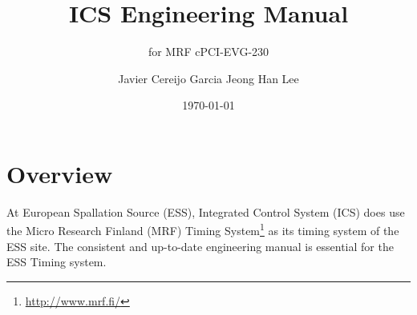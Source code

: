 \documentclass[11pt
  , a4paper
  , article
  , oneside
  , showtrims
]{memoir}
\begin{document}


\date{\today}




\title{ICS Engineering Manual}
\subtitle{for MRF cPCI-EVG-230}
\author{Javier Cereijo Garcia \newline Jeong Han Lee }



\showtrimson

\esstitle
\newpage
\tableofcontents
\newpage



\chapter{Overview}
At European Spallation Source (ESS), Integrated Control System (ICS) does use the Micro Research Finland (MRF) Timing System{\footnote{\url{http://www.mrf.fi/}}} as its timing system of the ESS site. The consistent and up-to-date engineering manual is essential for the ESS Timing system.
\end{document}

